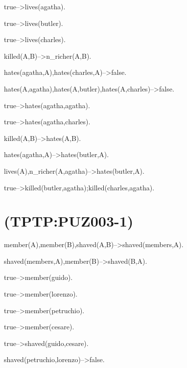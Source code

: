 true-->lives(agatha).

true-->lives(butler).

true-->lives(charles).

killed(A,B)-->n_richer(A,B).

hates(agatha,A),hates(charles,A)-->false.

hates(A,agatha),hates(A,butler),hates(A,charles)-->false.

true-->hates(agatha,agatha).

true-->hates(agatha,charles).

killed(A,B)-->hates(A,B).

hates(agatha,A)-->hates(butler,A).

lives(A),n_richer(A,agatha)-->hates(butler,A).

true-->killed(butler,agatha);killed(charles,agatha).

\newline
\section{(TPTP:PUZ003-1)}



member(A),member(B),shaved(A,B)-->shaved(members,A).

shaved(members,A),member(B)-->shaved(B,A).

true-->member(guido).

true-->member(lorenzo).

true-->member(petruchio).

true-->member(cesare).

true-->shaved(guido,cesare).

shaved(petruchio,lorenzo)-->false.

\newline
